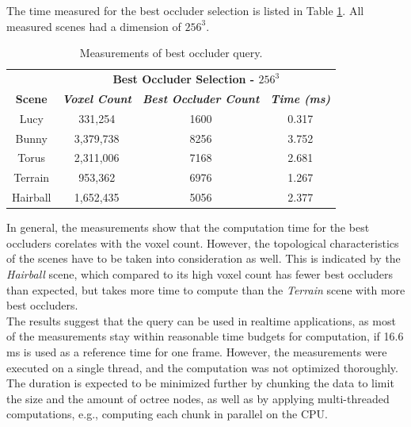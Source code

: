 \documentclass[conference]{IEEEtran}
\begin{document}
\noindent
The time measured for the best occluder selection is listed in Table \ref{tab:best-occluder-query}. 
All measured scenes had a dimension of $256^3$.

\begin{table}[htbp]
    \caption{Measurements of best occluder query.}
    \begin{center}
        \begin{tabular}{|c|c|c|c|}
            \hline
            \textbf{}&\multicolumn{3}{|c|}{\textbf{Best Occluder Selection - $256^3$}} \\
            \cline{2-4} 
            \textbf{Scene} & \textbf{\textit{Voxel Count}}& \textbf{\textit{Best Occluder Count}}& \textbf{\textit{Time (ms)}} \\
            \hline
            Lucy        & 331,254   & 1600 & 0.317 \\
            Bunny       & 3,379,738 & 8256 & 3.752 \\
            Torus       & 2,311,006 & 7168 & 2.681 \\
            Terrain     & 953,362   & 6976 & 1.267 \\
            Hairball    & 1,652,435 & 5056 & 2.377 \\
            \hline
        \end{tabular}
    \label{tab:best-occluder-query}
    \end{center}
\end{table}

\noindent
In general, the measurements show that the computation time for the best occluders corelates with the voxel count.
However, the topological characteristics of the scenes have to be taken into consideration as well. This is 
indicated by the \emph{Hairball} scene, which compared to its high voxel count has fewer best occluders than 
expected, but takes more time to compute than the \emph{Terrain} scene with more best occluders. \\

\noindent
The results suggest that the query can be used in realtime applications, as most of the measurements stay 
within reasonable time budgets for computation, if 16.6 ms is used as a reference time for one frame. However, 
the measurements were executed on a single thread, and the computation was not optimized thoroughly. The 
duration is expected to be minimized further by chunking the data to limit the size and the amount of octree 
nodes, as well as by applying multi-threaded computations, e.g., computing each chunk in parallel on the \ac{CPU}.
\end{document}
